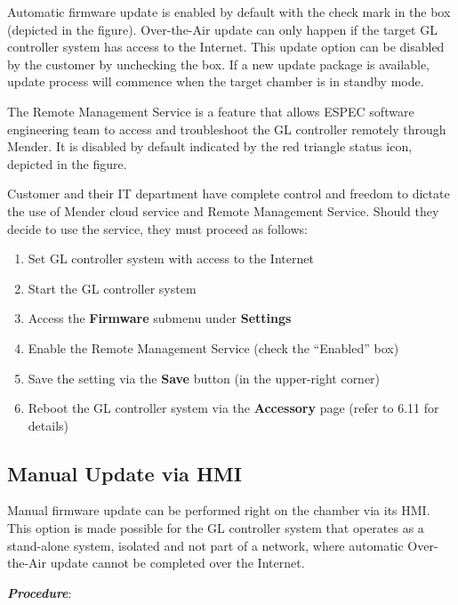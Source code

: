 Automatic firmware update is enabled by default with the check mark in
the box (depicted in the figure). Over-the-Air update can only happen if
the target GL controller system has access to the Internet. This update
option can be disabled by the customer by unchecking the box. If a new
update package is available, update process will commence when the
target chamber is in standby mode.

The Remote Management Service is a feature that allows ESPEC software
engineering team to access and troubleshoot the GL controller remotely
through Mender. It is disabled by default indicated by the red triangle
status icon, depicted in the figure.

Customer and their IT department have complete control and freedom to
dictate the use of Mender cloud service and Remote Management Service.
Should they decide to use the service, they must proceed as follows:

\begin{enumerate}
\def\labelenumi{\arabic{enumi}.}
\tightlist
\item
  Set GL controller system with access to the Internet
\item
  Start the GL controller system
\item
  Access the \textbf{Firmware} submenu under \textbf{Settings}
\item
  Enable the Remote Management Service (check the ``Enabled'' box)
\item
  Save the setting via the \textbf{Save} button (in the upper-right
  corner)
\item
  Reboot the GL controller system via the \textbf{Accessory} page (refer
  to 6.11 for details)
\end{enumerate}


\subsection{Manual Update via
HMI}

Manual firmware update can be performed right on the chamber via its
HMI. This option is made possible for the GL controller system that
operates as a stand-alone system, isolated and not part of a network,
where automatic Over-the-Air update cannot be completed over the
Internet.

\textbf{\emph{Procedure}}:

